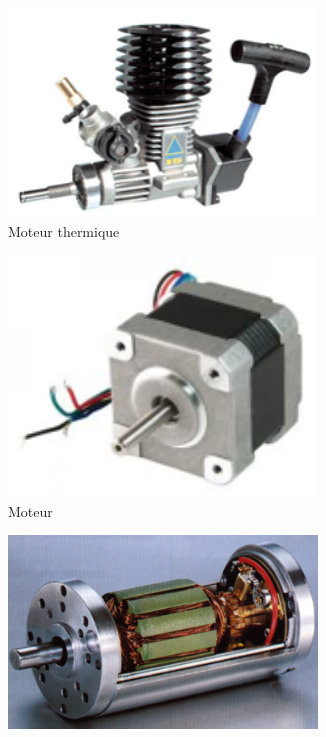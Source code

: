 \documentclass[10pt,fleqn]{article} %
\begin{document}
\begin{figure}[h]
  \centering
  \begin{subfigure}{0.25\textwidth}
    \centering
    \includegraphics[width=0.9\textwidth,height=.1\textheight,keepaspectratio]{images/moteur_thermique}
    \caption{Moteur thermique}
  \end{subfigure}\hfill
  \begin{subfigure}{.25\textwidth}
    \centering
    \includegraphics[width=0.9\textwidth,height=.1\textheight,keepaspectratio]{images/moteur_paspas}
    \caption{Moteur }
  \end{subfigure}\hfill
  \begin{subfigure}{0.25\textwidth}
    \centering
    \includegraphics[width=0.9\textwidth,height=.1\textheight,keepaspectratio]{images/moteur_continu}

\end{subfigure}
\end{figure}
\end{document}
